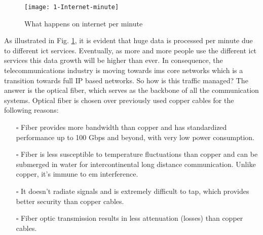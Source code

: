 \documentclass[../report.tex]{subfiles}
\begin{document}
\begin{figure}[!tbp]
	\centering
	\texttt{[image: 1-Internet-minute]}
	\caption{What happens on internet per minute \cite{internet_minute}}
	\label{fig:1_internet_minute}
\end{figure}
As illustrated in Fig. \ref{fig:1_internet_minute}, it is evident that huge data is processed per minute due to different \gls{ict} services. Eventually, as more and more people use the different \gls{ict} services this data growth will be higher than ever. In consequence, the telecommunications industry is moving towards \gls{ims} core networks which is a transition towards full IP based networks. So how is this traffic managed? The answer is the optical fiber, which serves as the backbone of all the communication systems. Optical fiber is chosen over previously used copper cables for the following reasons:
\begin{itemize}
	\item[$\square$] Fiber provides more bandwidth than copper and has standardized performance up to 100 Gbps and beyond, with very low power consumption.
	\item[$\square$] Fiber is less susceptible to temperature fluctuations than copper  and can be submerged in water for intercontinental long distance communication. Unlike copper, it’s immune to \gls{em} interference. 
	\item[$\square$] It doesn’t radiate signals and is extremely difficult to tap, which provides better security than copper cables.
	\item[$\square$] Fiber optic transmission results in less attenuation (losses) than copper cables.
\end{itemize}
\end{document}
